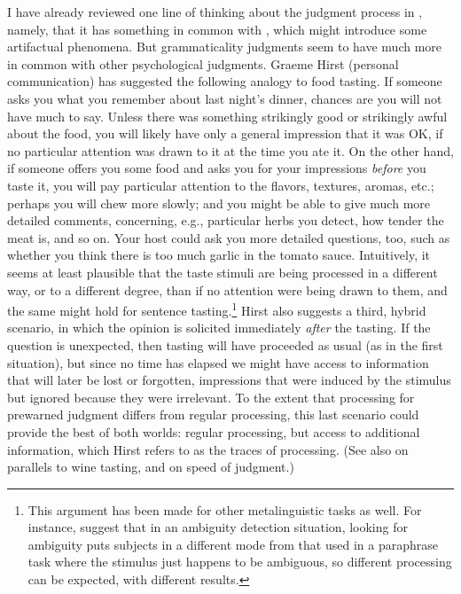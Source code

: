 I have already reviewed one line of thinking about the judgment process in , namely, that it has something in common with , which might introduce some artifactual phenomena. But grammaticality judgments seem to have much more in common with other psychological judgments. Graeme Hirst (personal communication) has suggested the following analogy to food tasting. If someone asks you what you remember about last night's dinner, chances are you will not have much to say. Unless there was something strikingly good or strikingly awful about the food, you will likely have only a general impression that it was OK, if no particular attention was drawn to it at the time you ate it. On the other hand, if someone offers you some food and asks you for your impressions \textit{before} you taste it, you will pay particular attention to the flavors, textures, aromas, etc.; perhaps you will chew more slowly; and you might be able to give much more detailed comments, concerning, e.g., particular herbs you detect, how
tender the meat is, and so on. Your host could ask you more detailed questions, too, such as whether you think there is too much garlic in the tomato sauce. Intuitively, it seems at least plausible that the taste stimuli are being processed in a different way, or to a different degree, than if no attention were being drawn to them, and the same might hold for sentence tasting.\footnote{ This argument has been made for other metalinguistic tasks as well. For instance, \citet{KessEtAl1983} suggest that in an ambiguity detection situation, looking for ambiguity puts subjects in a different mode from that used in a paraphrase task where the stimulus just happens to be ambiguous, so different processing can be expected, with different results.}
 Hirst also suggests a third, hybrid scenario, in which the opinion is solicited immediately \textit{after} the tasting. If the question is unexpected, then tasting will have proceeded as usual (as in the first situation), but since no time has elapsed we might have access to information that will later be lost or forgotten, impressions that were induced by the stimulus but ignored because they were irrelevant. To the extent that processing for prewarned judgment differs from regular processing, this last scenario could provide the best of both worlds: regular processing, but access to additional information, which Hirst refers to as the traces of processing. (See also  on parallels to wine tasting, and  on speed of judgment.)

